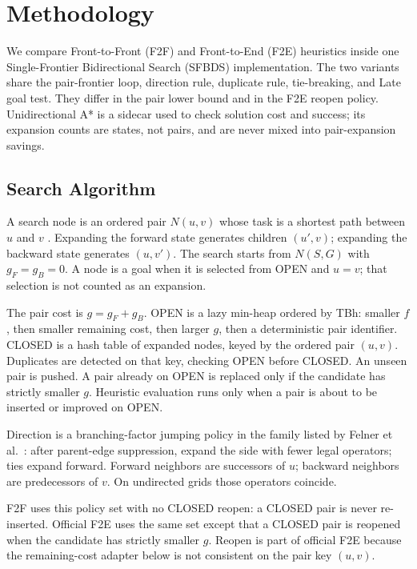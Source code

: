 \section{Methodology}

We compare Front-to-Front (F2F) and Front-to-End (F2E) heuristics inside one Single-Frontier Bidirectional Search (SFBDS) implementation. The two variants share the pair-frontier loop, direction rule, duplicate rule, tie-breaking, and Late goal test. They differ in the pair lower bound and in the F2E reopen policy. Unidirectional A* is a sidecar used to check solution cost and success; its expansion counts are states, not pairs, and are never mixed into pair-expansion savings.

\subsection{Search Algorithm}

A search node is an ordered pair \(N(u,v)\) whose task is a shortest path between \(u\) and \(v\) \cite{felner2010sfbds}. Expanding the forward state generates children \((u',v)\); expanding the backward state generates \((u,v')\). The search starts from \(N(S,G)\) with \(g_F=g_B=0\). A node is a goal when it is selected from OPEN and \(u=v\); that selection is not counted as an expansion.

The pair cost is \(g=g_F+g_B\). OPEN is a lazy min-heap ordered by TBh: smaller \(f\), then smaller remaining cost, then larger \(g\), then a deterministic pair identifier. CLOSED is a hash table of expanded nodes, keyed by the ordered pair \((u,v)\). Duplicates are detected on that key, checking OPEN before CLOSED. An unseen pair is pushed. A pair already on OPEN is replaced only if the candidate has strictly smaller \(g\). Heuristic evaluation runs only when a pair is about to be inserted or improved on OPEN.

Direction is a branching-factor jumping policy in the family listed by Felner et al.\ \cite{felner2010sfbds}: after parent-edge suppression, expand the side with fewer legal operators; ties expand forward. Forward neighbors are successors of \(u\); backward neighbors are predecessors of \(v\). On undirected grids those operators coincide.

F2F uses this policy set with no CLOSED reopen: a CLOSED pair is never re-inserted. Official F2E uses the same set except that a CLOSED pair is reopened when the candidate has strictly smaller \(g\). Reopen is part of official F2E because the remaining-cost adapter below is not consistent on the pair key \((u,v)\).

